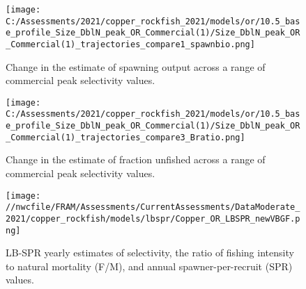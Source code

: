 \documentclass[11pt,
  english,
  a4paper,
]{article}
\begin{document}
\tagmcend\tagstructend


\begin{figure}
\centering
\texttt{[image: C:/Assessments/2021/copper\_rockfish\_2021/models/or/10.5\_base\_profile\_Size\_DblN\_peak\_OR\_Commercial(1)/Size\_DblN\_peak\_OR\_Commercial(1)\_trajectories\_compare1\_spawnbio.png]}
\caption{Change in the estimate of spawning output across a range of commercial peak selectivity values.\label{fig:selex-ssb}}
\end{figure}

\tagmcend\tagstructend


\begin{figure}
\centering
\texttt{[image: C:/Assessments/2021/copper\_rockfish\_2021/models/or/10.5\_base\_profile\_Size\_DblN\_peak\_OR\_Commercial(1)/Size\_DblN\_peak\_OR\_Commercial(1)\_trajectories\_compare3\_Bratio.png]}
\caption{Change in the estimate of fraction unfished across a range of commercial peak selectivity values.\label{fig:selex-depl}}
\end{figure}

\tagmcend\tagstructend

\newpage


\begin{figure}
\centering
\texttt{[image: //nwcfile/FRAM/Assessments/CurrentAssessments/DataModerate\_2021/copper\_rockfish/models/lbspr/Copper\_OR\_LBSPR\_newVBGF.png]}
\caption{LB-SPR yearly estimates of selectivity, the ratio of fishing intensity to natural mortality (F/M), and annual spawner-per-recruit (SPR) values.\label{fig:lbspr}}
\end{figure}

\tagmcend\tagstructend

\newpage

\end{document}
